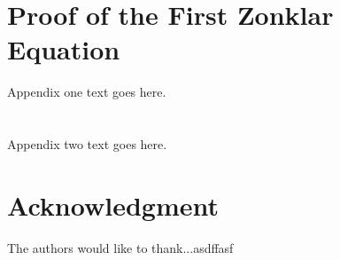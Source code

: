 \documentclass[journal,transmag]{IEEEtran}
\begin{document}
%


\appendices
\section{Proof of the First Zonklar Equation}
Appendix one text goes here.

\section{}
Appendix two text goes here.


\section*{Acknowledgment}


The authors would like to thank...asdffasf


\ifCLASSOPTIONcaptionsoff
  \newpage
\fi







%
\end{document}
